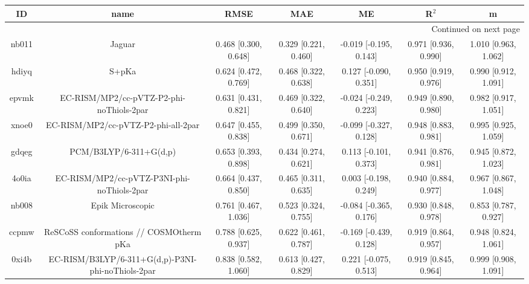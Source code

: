 \documentclass{article}
\begin{document}
\begin{center}
\begin{longtable}{|ccccccc|}
\toprule
    ID &                                               name &                  RMSE &                   MAE &                       ME &                 R$^2$ &                      m \\
\midrule
\endhead
\midrule
\multicolumn{7}{r}{{Continued on next page}} \\
\midrule
\endfoot

\bottomrule
\endlastfoot
 nb011 &                                             Jaguar &  0.468 [0.300, 0.648] &  0.329 [0.221, 0.460] &   -0.019 [-0.195, 0.143] &  0.971 [0.936, 0.990] &   1.010 [0.963, 1.062] \\
 hdiyq &                                              S+pKa &  0.624 [0.472, 0.769] &  0.468 [0.322, 0.638] &    0.127 [-0.090, 0.351] &  0.950 [0.919, 0.976] &   0.990 [0.912, 1.091] \\
 epvmk &           EC-RISM/MP2/cc-pVTZ-P2-phi-noThiols-2par &  0.631 [0.431, 0.821] &  0.469 [0.322, 0.640] &   -0.024 [-0.249, 0.223] &  0.949 [0.890, 0.980] &   0.982 [0.917, 1.051] \\
 xnoe0 &                EC-RISM/MP2/cc-pVTZ-P2-phi-all-2par &  0.647 [0.455, 0.838] &  0.499 [0.350, 0.671] &   -0.099 [-0.327, 0.128] &  0.948 [0.883, 0.981] &   0.995 [0.925, 1.059] \\
 gdqeg &                             PCM/B3LYP/6-311+G(d,p) &  0.653 [0.393, 0.898] &  0.434 [0.274, 0.621] &    0.113 [-0.101, 0.373] &  0.941 [0.876, 0.981] &   0.945 [0.872, 1.023] \\
 4o0ia &         EC-RISM/MP2/cc-pVTZ-P3NI-phi-noThiols-2par &  0.664 [0.437, 0.850] &  0.465 [0.311, 0.635] &    0.003 [-0.198, 0.249] &  0.940 [0.884, 0.977] &   0.967 [0.867, 1.048] \\
 nb008 &                                   Epik Microscopic &  0.761 [0.467, 1.036] &  0.523 [0.324, 0.755] &   -0.084 [-0.365, 0.176] &  0.930 [0.848, 0.978] &   0.853 [0.787, 0.927] \\
 ccpmw &            ReSCoSS conformations // COSMOtherm pKa &  0.788 [0.625, 0.937] &  0.622 [0.461, 0.787] &   -0.169 [-0.439, 0.128] &  0.919 [0.864, 0.957] &   0.948 [0.824, 1.061] \\
 0xi4b &  EC-RISM/B3LYP/6-311+G(d,p)-P3NI-phi-noThiols-2par &  0.838 [0.582, 1.060] &  0.613 [0.427, 0.829] &    0.221 [-0.075, 0.513] &  0.919 [0.845, 0.964] &   0.999 [0.908, 1.091] \\

\end{longtable}
\end{center}
\end{document}
